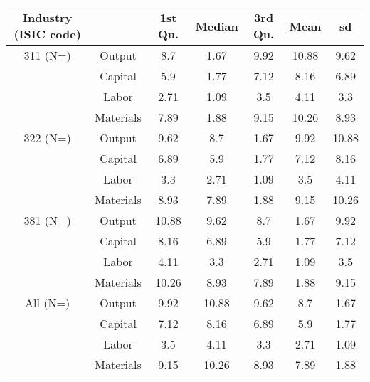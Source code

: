 \begin{table}[H]
\centering
\begin{tabular}{ccccccc}
  \hline\hline Industry (ISIC code) &   & 1st Qu. & Median & 3rd Qu. & Mean & sd \\ 
  \hline
311 (N=) & Output & 8.7 & 1.67 & 9.92 & 10.88 & 9.62 \\ 
   & Capital & 5.9 & 1.77 & 7.12 & 8.16 & 6.89 \\ 
   & Labor & 2.71 & 1.09 & 3.5 & 4.11 & 3.3 \\ 
   & Materials & 7.89 & 1.88 & 9.15 & 10.26 & 8.93 \\ 
  322 (N=) & Output & 9.62 & 8.7 & 1.67 & 9.92 & 10.88 \\ 
   & Capital & 6.89 & 5.9 & 1.77 & 7.12 & 8.16 \\ 
   & Labor & 3.3 & 2.71 & 1.09 & 3.5 & 4.11 \\ 
   & Materials & 8.93 & 7.89 & 1.88 & 9.15 & 10.26 \\ 
  381 (N=) & Output & 10.88 & 9.62 & 8.7 & 1.67 & 9.92 \\ 
   & Capital & 8.16 & 6.89 & 5.9 & 1.77 & 7.12 \\ 
   & Labor & 4.11 & 3.3 & 2.71 & 1.09 & 3.5 \\ 
   & Materials & 10.26 & 8.93 & 7.89 & 1.88 & 9.15 \\ 
  All (N=) & Output & 9.92 & 10.88 & 9.62 & 8.7 & 1.67 \\ 
   & Capital & 7.12 & 8.16 & 6.89 & 5.9 & 1.77 \\ 
   & Labor & 3.5 & 4.11 & 3.3 & 2.71 & 1.09 \\ 
   & Materials & 9.15 & 10.26 & 8.93 & 7.89 & 1.88 \\ 
   \hline
\end{tabular}
\end{table}

